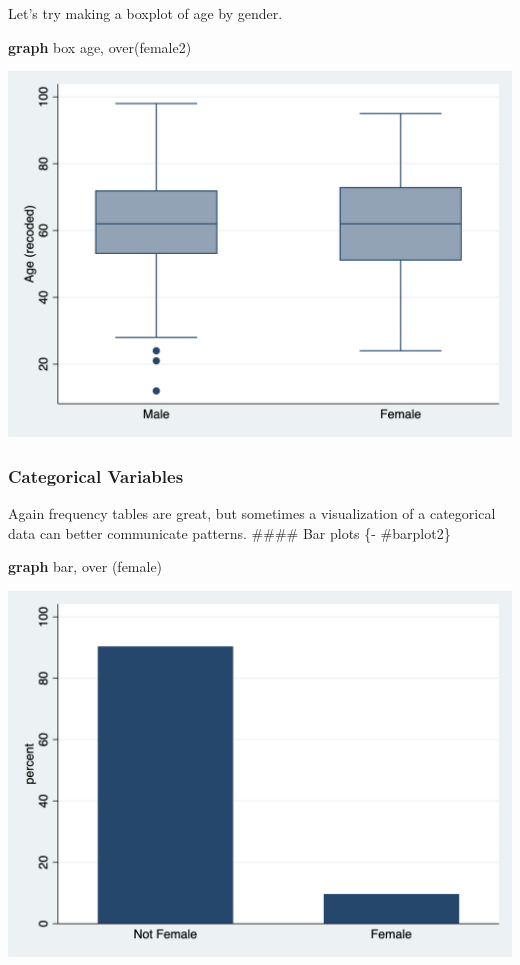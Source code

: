 \documentclass[
]{book}
\newenvironment{Shaded}{\begin{snugshade}}{\end{snugshade}}
\newcommand{\BaseNTok}[1]{\textcolor[rgb]{0.00,0.00,0.81}{#1}}
\newcommand{\KeywordTok}[1]{\textcolor[rgb]{0.13,0.29,0.53}{\textbf{#1}}}
\newcommand{\NormalTok}[1]{#1}
\begin{document}
Let's try making a boxplot of age by gender.

\begin{Shaded}
\begin{Highlighting}[]
\KeywordTok{graph}\NormalTok{ box age, }\BaseNTok{over}\NormalTok{(female2)}
\end{Highlighting}
\end{Shaded}

\includegraphics{images/boxover_stata.png}

\hypertarget{categorical-variables}{%
\subsubsection*{Categorical Variables}\label{categorical-variables}}

Again frequency tables are great, but sometimes a visualization of a categorical data can better communicate patterns.
\#\#\#\# Bar plots \{- \#barplot2\}

\begin{Shaded}
\begin{Highlighting}[]
\KeywordTok{graph} \BaseNTok{bar}\NormalTok{, }\BaseNTok{over}\NormalTok{ (female)}
\end{Highlighting}
\end{Shaded}

\includegraphics{images/bar_stata.png}
\end{document}
